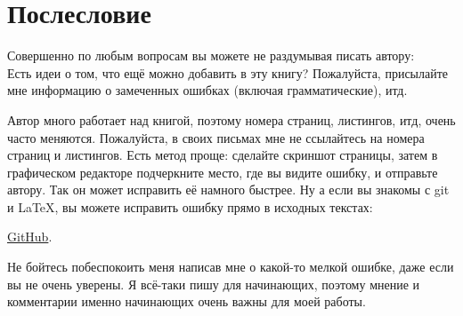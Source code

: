 \part*{Послесловие}


Совершенно по любым вопросам вы можете не раздумывая писать автору: \\
\GTT{<\EMAIL>}
Есть идеи о том, что ещё можно добавить в эту книгу?
Пожалуйста, присылайте мне информацию о замеченных ошибках (включая грамматические), итд.

Автор много работает над книгой, поэтому номера страниц, листингов, итд, очень часто меняются.
Пожалуйста, в своих письмах мне не ссылайтесь на номера страниц и листингов.
Есть метод проще: сделайте скриншот страницы, затем в графическом редакторе подчеркните место, где вы видите
ошибку, и отправьте автору. Так он может исправить её намного быстрее.
Ну а если вы знакомы с git и \LaTeX, вы можете исправить ошибку прямо в исходных текстах:

\href{http://go.yurichev.com/17089}{GitHub}.

Не бойтесь побеспокоить меня написав мне о какой-то мелкой ошибке, даже если вы не очень уверены.
Я всё-таки пишу для начинающих, поэтому мнение и комментарии именно начинающих очень важны для моей работы.

